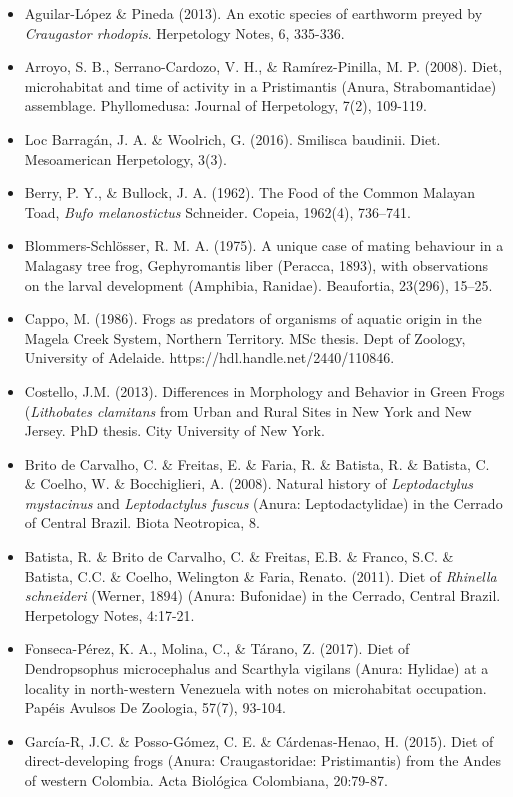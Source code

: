 \begin{itemize}
\item Aguilar-López \& Pineda (2013). An exotic species of earthworm preyed by \textit{Craugastor rhodopis}. Herpetology Notes, 6, 335-336.
\item Arroyo, S. B., Serrano-Cardozo, V. H., \& Ramírez-Pinilla, M. P. (2008). Diet, microhabitat and time of activity in a Pristimantis (Anura, Strabomantidae) assemblage. Phyllomedusa: Journal of Herpetology, 7(2), 109-119.         
\item Loc Barragán, J. A. \& Woolrich, G. (2016). Smilisca baudinii. Diet. Mesoamerican Herpetology, 3(3).
\item Berry, P. Y., \& Bullock, J. A. (1962). The Food of the Common Malayan Toad, \textit{Bufo melanostictus} Schneider. Copeia, 1962(4), 736–741. 
\item Blommers-Schlösser, R. M. A. (1975). A unique case of mating behaviour in a Malagasy tree frog, Gephyromantis liber (Peracca, 1893), with observations on the larval development (Amphibia, Ranidae). Beaufortia, 23(296), 15–25.
\item Cappo, M. (1986). Frogs as predators of organisms of aquatic origin in the Magela Creek System, Northern Territory. MSc thesis. Dept of Zoology, University of Adelaide. https://hdl.handle.net/2440/110846.
\item Costello, J.M. (2013). Differences in Morphology and Behavior in Green Frogs (\textit{Lithobates clamitans} from Urban and Rural Sites in New York and New Jersey. PhD thesis. City University of New York. 
\item Brito de Carvalho, C. \& Freitas, E. \& Faria, R. \& Batista, R. \& Batista, C. \& Coelho, W. \& Bocchiglieri, A. (2008). Natural history of \textit{Leptodactylus mystacinus} and \textit{Leptodactylus fuscus} (Anura: Leptodactylidae) in the Cerrado of Central Brazil. Biota Neotropica, 8. 
\item Batista, R. \& Brito de Carvalho, C. \& Freitas, E.B. \& Franco, S.C. \& Batista, C.C. \& Coelho, Welington \& Faria, Renato. (2011). Diet of \textit{Rhinella schneideri} (Werner, 1894) (Anura: Bufonidae) in the Cerrado, Central Brazil. Herpetology Notes, 4:17-21. 
\item Fonseca-Pérez, K. A., Molina, C., \& Tárano, Z. (2017). Diet of Dendropsophus microcephalus and Scarthyla vigilans (Anura: Hylidae) at a locality in north-western Venezuela with notes on microhabitat occupation. Papéis Avulsos De Zoologia, 57(7), 93-104.
\item García-R, J.C. \& Posso-Gómez, C. E. \& Cárdenas-Henao, H. (2015). Diet of direct-developing frogs (Anura: Craugastoridae: Pristimantis) from the Andes of western Colombia. Acta Biológica Colombiana, 20:79-87. 

\end{itemize}
